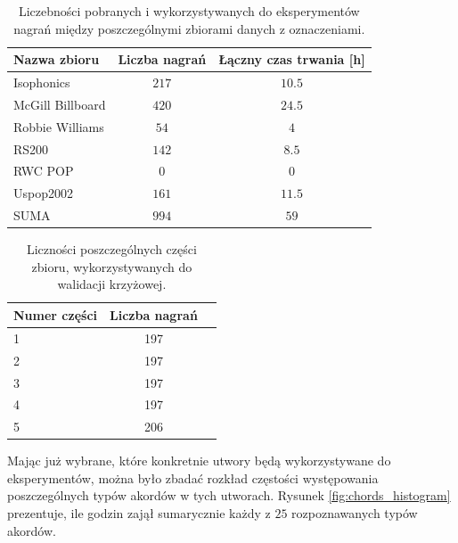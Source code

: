 \begin{table}
    \centering
    \caption{Liczebności pobranych i wykorzystywanych do eksperymentów nagrań między poszczególnymi zbiorami danych z oznaczeniami.}
    \label{tab:datasets2}
    \begin{tabular}{|l|c|c|}
        \hline
        Nazwa zbioru & Liczba nagrań & Łączny czas trwania [h] \\
        \hline
        Isophonics          & $217$ & $10.5$ \\ %
        McGill Billboard    & $420$ & $24.5$ \\ %
        Robbie Williams     & $54$  & $4$    \\ %
        RS200               & $142$ & $8.5$  \\ %
        RWC POP             & $0$   & $0$    \\
        Uspop2002           & $161$ & $11.5$ \\ %
        \hline
        SUMA                & $994$ & $59$   \\
        \hline
    \end{tabular}
\end{table}

\begin{table}
    \centering
    \caption{Liczności poszczególnych części zbioru, wykorzystywanych do walidacji krzyżowej.}
    \label{tab:datasets3}
    \begin{tabular}{|l|c|c|}
        \hline
        Numer części & Liczba nagrań \\
        \hline
        1  & 197 \\
        2  & 197 \\
        3  & 197 \\
        4  & 197 \\
        5  & 206 \\
        \hline
    \end{tabular}
\end{table}

Mając już wybrane, które konkretnie utwory będą wykorzystywane do eksperymentów, można było zbadać rozkład częstości występowania poszczególnych typów akordów w tych utworach. Rysunek \ref{fig:chords_histogram} prezentuje, ile godzin zajął sumarycznie każdy z $25$ rozpoznawanych typów akordów.

